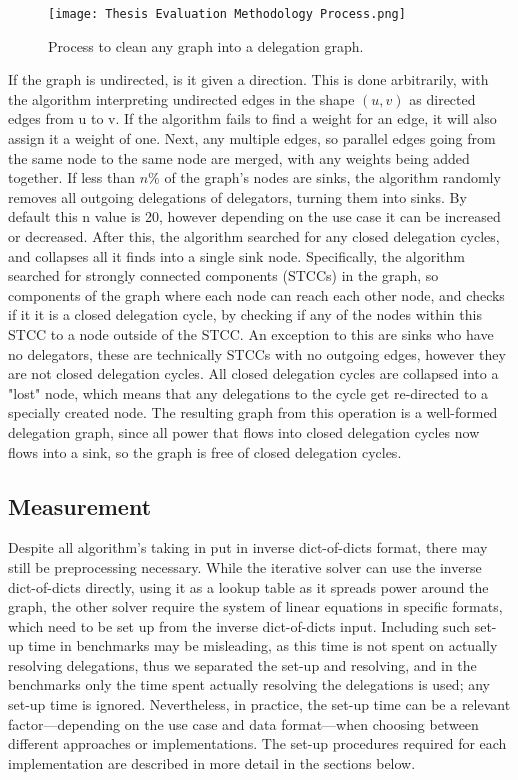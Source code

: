\begin{figure}[t]
    \centering
    \texttt{[image: Thesis Evaluation Methodology Process.png]}
    \caption{Process to clean any graph into a delegation graph.}
    \label{fig:cleaning_process}
\end{figure}

If the graph is undirected, is it given a direction. This is done arbitrarily, with the algorithm interpreting undirected edges in the shape $(u, v)$ as directed edges from u to v. If the algorithm fails to find a weight for an edge, it will also assign it a weight of one. Next, any multiple edges, so parallel edges going from the same node to the same node are merged, with any weights being added together. If less than $n\%$ of the graph's nodes are sinks, the algorithm randomly removes all outgoing delegations of delegators, turning them into sinks. By default this n value is 20, however depending on the use case it can be increased or decreased. After this, the algorithm searched for any closed delegation cycles, and collapses all it finds into a single sink node. Specifically, the algorithm searched for strongly connected components (STCCs) in the graph, so components of the graph where each node can reach each other node, and checks if it it is a closed delegation cycle, by checking if any of the nodes within this STCC to a node outside of the STCC. An exception to this are sinks who have no delegators, these are technically STCCs with no outgoing edges, however they are not closed delegation cycles. All closed delegation cycles are collapsed into a "lost" node, which means that any delegations to the cycle get re-directed to a specially created node. The resulting graph from this operation is a well-formed delegation graph, since all power that flows into closed delegation cycles now flows into a sink, so the graph is free of closed delegation cycles.

\subsection{Measurement}

Despite all algorithm's taking in put in inverse dict-of-dicts format, there may still be preprocessing necessary. While the iterative solver can use the inverse dict-of-dicts directly, using it as a lookup table as it spreads power around the graph, the other solver require the system of linear equations in specific formats, which need to be set up from the inverse dict-of-dicts input. Including such set-up time in benchmarks may be misleading, as this time is not spent on actually resolving delegations, thus we separated the set-up and resolving, and in the benchmarks only the time spent actually resolving the delegations is used; any set-up time is ignored. Nevertheless, in practice, the set-up time can be a relevant factor—depending on the use case and data format—when choosing between different approaches or implementations. The set-up procedures required for each implementation are described in more detail in the sections below.

